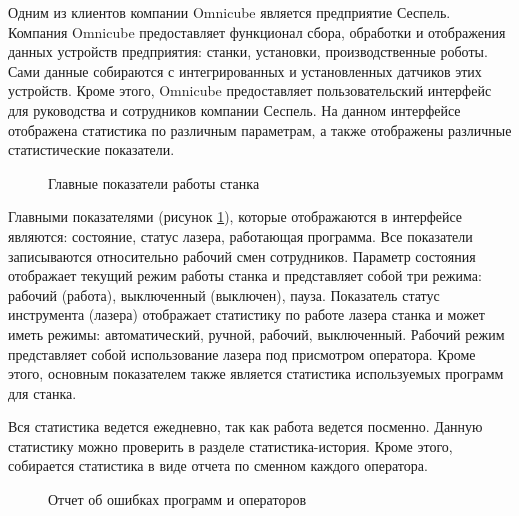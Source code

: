 Одним из клиентов компании Omnicube является предприятие Сеспель.
Компания Omnicube предоставляет функционал сбора, обработки и отображения
данных устройств предприятия: станки, установки, производственные роботы. 
Сами данные собираются с интегрированных и установленных датчиков этих устройств.
Кроме этого, Omnicube предоставляет
пользовательский интерфейс для руководства и сотрудников компании Сеспель.
На данном интерфейсе отображена статистика по различным параметрам,
а также отображены различные статистические показатели.

\begin{figure}[ht!]
    \caption{Главные показатели работы станка}
    \label{main}
\end{figure}

Главными показателями (рисунок \ref{main}), которые отображаются в интерфейсе являются:
состояние, статус лазера, работающая программа.
Все показатели записываются относительно рабочий смен сотрудников.
Параметр состояния отображает текущий режим работы станка
и представляет собой три режима: рабочий (работа),
выключенный (выключен), пауза.
Показатель статус инструмента (лазера) отображает
статистику по работе лазера станка и может иметь режимы:
автоматический, ручной, рабочий, выключенный.
Рабочий режим представляет собой использование лазера под присмотром оператора.
Кроме этого, основным показателем также является статистика используемых программ для станка.

Вся статистика ведется ежедневно, так как работа ведется посменно.
Данную статистику можно проверить в разделе статистика-история.
Кроме этого, собирается статистика в виде отчета по сменном каждого оператора.


\begin{figure}[ht!]
    \caption{Отчет об ошибках программ и операторов}
    \label{errors}
\end{figure}




